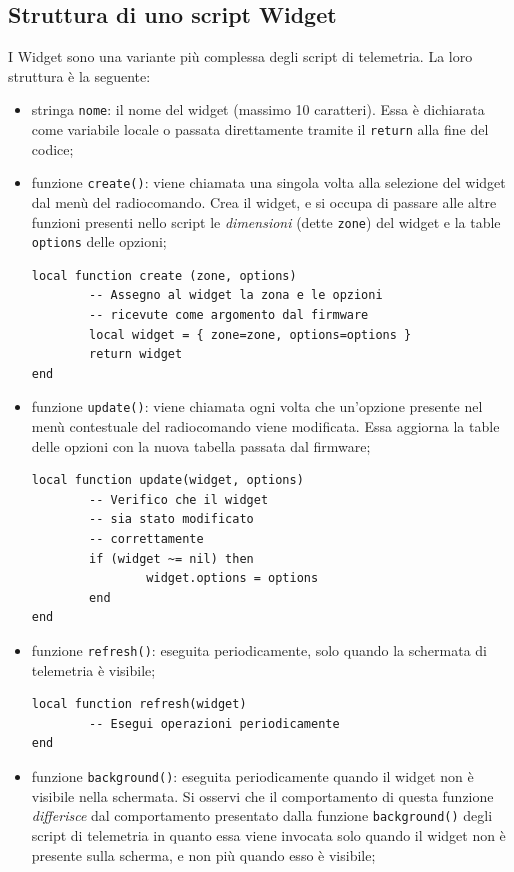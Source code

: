 \documentclass[a4paper, 12pt]{report}
\begin{document}
\subsection{Struttura di uno script Widget}
I Widget sono una variante più complessa degli script di telemetria. La loro struttura è la seguente:
\begin{itemize}
        \item stringa \texttt{nome}: il nome del widget (massimo 10 caratteri). Essa è dichiarata come variabile locale o passata direttamente tramite il \texttt{return} alla fine del codice;
        \item funzione \texttt{create()}: viene chiamata una singola volta alla selezione del widget dal menù del radiocomando. Crea il widget, e si occupa di passare alle altre funzioni presenti nello script le \emph{dimensioni} (dette \texttt{zone}) del widget e la table \texttt{options} delle opzioni;
\begin{lstlisting}
local function create (zone, options)
        -- Assegno al widget la zona e le opzioni
        -- ricevute come argomento dal firmware
        local widget = { zone=zone, options=options }
        return widget
end
\end{lstlisting}
        \item funzione \texttt{update()}: viene chiamata ogni volta che un'opzione presente nel menù contestuale del radiocomando viene modificata. Essa aggiorna la table delle opzioni con la nuova tabella passata dal firmware;
\begin{lstlisting}
local function update(widget, options)
        -- Verifico che il widget
        -- sia stato modificato
        -- correttamente
        if (widget ~= nil) then
                widget.options = options
        end
end
\end{lstlisting}
        \item funzione \texttt{refresh()}: eseguita periodicamente, solo quando la schermata di telemetria è visibile;
\begin{lstlisting}
local function refresh(widget)
        -- Esegui operazioni periodicamente
end
\end{lstlisting}
        \item funzione \texttt{background()}: eseguita periodicamente quando il widget non è visibile nella schermata. Si osservi che il comportamento di questa funzione \emph{differisce} dal comportamento presentato dalla funzione \texttt{background()} degli script di telemetria in quanto essa viene invocata solo quando il widget non è presente sulla scherma, e non più quando esso è visibile;

\end{itemize}
\end{document}
